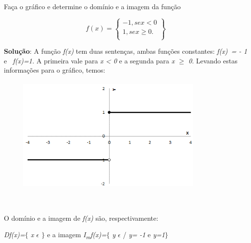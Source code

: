 \begin{texemplo}
Faça o gráfico e determine o domínio e a imagem da função

 \[ f \left( x \right) = \left\{ \begin{matrix}
-1, se x<0\\
1 , se x \geq 0.\\
\end{matrix} \right\}
\] 

\textbf{Solução}: A função \textit{f(x)} tem duas sentenças, ambas funções constantes: \textit{f(x)~= - 1  }e\textit{~ f(x)=1. }A primeira vale para \textit{x < 0} e a segunda para \textit{x $ \geq $  0}. Levando estas informações para o gráfico, temos:

\begin{figure}[H]
	\begin{Center}
		\includegraphics[width=3.66in,height=2.29in]{capitulos/outras_funcoes/media/image22.png}
	\end{Center}
\end{figure}

~~

\quad O domínio e a imagem de \textit{f(x)} são, respectivamente: 

\textit{Df(x)=$ \{ $ x $ \epsilon $\textbf{ }$ \} $ } e a imagem  \textit{I\textsubscript{m}f(x)=$ \{ $ y $ \epsilon $  }/ \textit{y= -1} e \textit{y=1$ \} $ } \qedsymbol{}
\end{texemplo}

